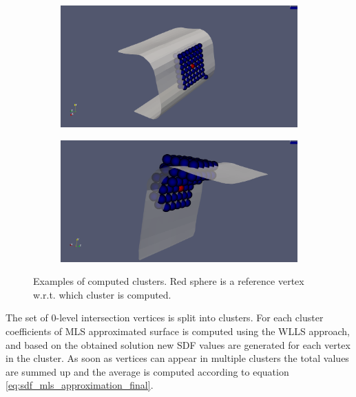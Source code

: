 \begin{figure}[H]
	\begin{center}
		\begin{subfigure}[b]{0.45\textwidth}
			\includegraphics[width=\textwidth]{figures/MlsCluster.png}
		\end{subfigure}
		\begin{subfigure}[b]{0.45\textwidth}
			\includegraphics[width=\textwidth]{figures/MlsCluster2.png}
		\end{subfigure}
	\end{center}
	\caption{Examples of computed clusters. Red sphere is a reference vertex w.r.t. which cluster is computed.}
	\label{fig:clusters}
\end{figure}

The set of 0-level intersection vertices is split into clusters. For each cluster coefficients of MLS approximated surface is computed using the WLLS approach, and based on the obtained solution new SDF values are generated for each vertex in the cluster. As soon as vertices can appear in multiple clusters the total values are summed up and the average is computed according to equation \ref{eq:sdf_mls_approximation_final}.\\

